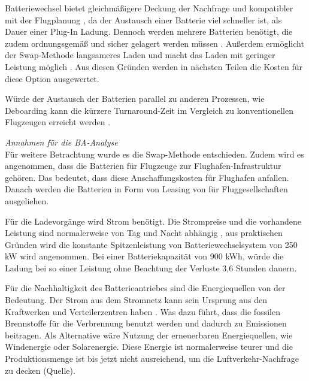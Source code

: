 Batteriewechsel bietet gleichmäßigere Deckung der Nachfrage \cite{guo2020aviation} und kompatibler mit der Flugplanung \cite{salucci2020optimal}, 
da der Austausch einer Batterie viel schneller ist, als Dauer einer Plug-In Ladung. 
Dennoch werden mehrere Batterien benötigt, die zudem ordnungsgemäß und sicher gelagert werden müssen \cite{salucci2020optimal}.
Außerdem ermöglicht der Swap-Methode langsameres Laden und macht das Laden mit geringer Leistung möglich \cite{avogadro2024demystifying}.
Aus diesen Gründen werden in nächsten Teilen die Kosten für diese Option ausgewertet. 

Würde der Austausch der Batterien parallel zu anderen Prozessen, wie Deboarding kann die kürzere Turnaround-Zeit im 
Vergleich zu konventionellen Flugzeugen erreicht werden \cite{schmidt2016challenges}.

\textit{Annahmen für die BA-Analyse}\\
%
Für weitere Betrachtung wurde es die Swap-Methode entschieden. Zudem wird es angenommen, 
dass die Batterien für Flugzeuge zur Flughafen-Infrastruktur gehören.
Das bedeutet, dass diese Anschaffungskosten für Flughafen anfallen. Danach werden die Batterien in Form von Leasing 
von für Fluggesellschaften ausgeliehen.

Für die Ladevorgänge wird Strom benötigt. 
Die Strompreise und die vorhandene Leistung sind normalerweise von Tag und Nacht abhängig \cite{salucci2020optimal}, 
aus praktischen Gründen wird die konstante Spitzenleistung von Batteriewechselsystem von 250 kW wird angenommen. 
Bei einer Batteriekapazität von 900 kWh, würde die Ladung bei so einer Leistung ohne Beachtung der Verluste 3,6 Stunden dauern.

Für die Nachhaltigkeit des Batterieantriebes sind die Energiequellen von der Bedeutung. 
Der Strom aus dem Stromnetz kann sein Ursprung aus den Kraftwerken und Verteilerzentren haben \cite{dalmia2022powering}. 
Was dazu führt, dass die fossilen Brennstoffe für die Verbrennung benutzt werden und dadurch zu Emissionen beitragen. 
Als Alternative wäre Nutzung der erneuerbaren Energiequellen, wie Windenergie oder Solarenergie. Diese Energie ist normalerweise teurer
und die Produktionsmenge ist bis jetzt nicht ausreichend, um die Luftverkehr-Nachfrage zu decken (Quelle).


